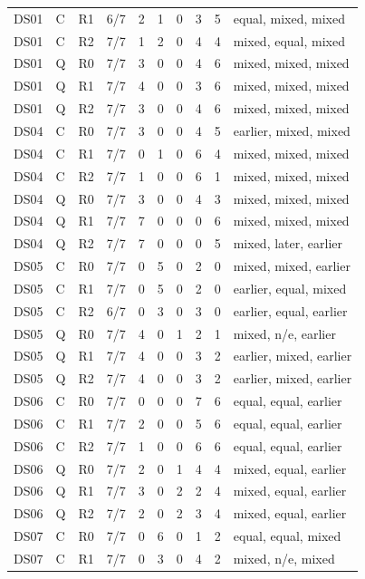 \documentclass[10pt]{article}
\begin{document}
{\begin{longtable}{lllrrrrrrl}
DS01 & C & R1 & 6/7 & 2 & 1 & 0 & 3 & 5 & equal, mixed, mixed \\
DS01 & C & R2 & 7/7 & 1 & 2 & 0 & 4 & 4 & mixed, equal, mixed \\
DS01 & Q & R0 & 7/7 & 3 & 0 & 0 & 4 & 6 & mixed, mixed, mixed \\
DS01 & Q & R1 & 7/7 & 4 & 0 & 0 & 3 & 6 & mixed, mixed, mixed \\
DS01 & Q & R2 & 7/7 & 3 & 0 & 0 & 4 & 6 & mixed, mixed, mixed \\
\midrule
DS04 & C & R0 & 7/7 & 3 & 0 & 0 & 4 & 5 & earlier, mixed, mixed \\
DS04 & C & R1 & 7/7 & 0 & 1 & 0 & 6 & 4 & mixed, mixed, mixed \\
DS04 & C & R2 & 7/7 & 1 & 0 & 0 & 6 & 1 & mixed, mixed, mixed \\
DS04 & Q & R0 & 7/7 & 3 & 0 & 0 & 4 & 3 & mixed, mixed, mixed \\
DS04 & Q & R1 & 7/7 & 7 & 0 & 0 & 0 & 6 & mixed, mixed, mixed \\
DS04 & Q & R2 & 7/7 & 7 & 0 & 0 & 0 & 5 & mixed, later, earlier \\
\midrule
DS05 & C & R0 & 7/7 & 0 & 5 & 0 & 2 & 0 & mixed, mixed, earlier \\
DS05 & C & R1 & 7/7 & 0 & 5 & 0 & 2 & 0 & earlier, equal, mixed \\
DS05 & C & R2 & 6/7 & 0 & 3 & 0 & 3 & 0 & earlier, equal, earlier \\
DS05 & Q & R0 & 7/7 & 4 & 0 & 1 & 2 & 1 & mixed, n/e, earlier \\
DS05 & Q & R1 & 7/7 & 4 & 0 & 0 & 3 & 2 & earlier, mixed, earlier \\
DS05 & Q & R2 & 7/7 & 4 & 0 & 0 & 3 & 2 & earlier, mixed, earlier \\
\midrule
DS06 & C & R0 & 7/7 & 0 & 0 & 0 & 7 & 6 & equal, equal, earlier \\
DS06 & C & R1 & 7/7 & 2 & 0 & 0 & 5 & 6 & equal, equal, earlier \\
DS06 & C & R2 & 7/7 & 1 & 0 & 0 & 6 & 6 & equal, equal, earlier \\
DS06 & Q & R0 & 7/7 & 2 & 0 & 1 & 4 & 4 & mixed, equal, earlier \\
DS06 & Q & R1 & 7/7 & 3 & 0 & 2 & 2 & 4 & mixed, equal, earlier \\
DS06 & Q & R2 & 7/7 & 2 & 0 & 2 & 3 & 4 & mixed, equal, earlier \\
\midrule
DS07 & C & R0 & 7/7 & 0 & 6 & 0 & 1 & 2 & equal, equal, mixed \\
DS07 & C & R1 & 7/7 & 0 & 3 & 0 & 4 & 2 & mixed, n/e, mixed \\

\end{longtable}}
\end{document}
